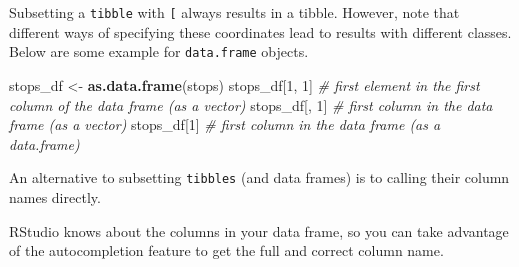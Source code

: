\documentclass[
]{book}
\newenvironment{Shaded}{\begin{snugshade}}{\end{snugshade}}
\newcommand{\CommentTok}[1]{\textcolor[rgb]{0.56,0.35,0.01}{\textit{#1}}}
\newcommand{\DecValTok}[1]{\textcolor[rgb]{0.00,0.00,0.81}{#1}}
\newcommand{\FunctionTok}[1]{\textcolor[rgb]{0.13,0.29,0.53}{\textbf{#1}}}
\newcommand{\NormalTok}[1]{#1}
\newcommand{\OtherTok}[1]{\textcolor[rgb]{0.56,0.35,0.01}{#1}}
\newcommand{\SpecialCharTok}[1]{\textcolor[rgb]{0.81,0.36,0.00}{\textbf{#1}}}
\newcommand{\StringTok}[1]{\textcolor[rgb]{0.31,0.60,0.02}{#1}}
\begin{document}
Subsetting a \texttt{tibble} with \texttt{{[}} always results in a tibble. However, note that different ways of specifying these coordinates lead to results with different classes. Below are some example for \texttt{data.frame} objects.

\begin{Shaded}
\begin{Highlighting}[]
\NormalTok{stops\_df }\OtherTok{\textless{}{-}} \FunctionTok{as.data.frame}\NormalTok{(stops)}
\NormalTok{stops\_df[}\DecValTok{1}\NormalTok{, }\DecValTok{1}\NormalTok{]   }\CommentTok{\# first element in the first column of the data frame (as a vector)}
\NormalTok{stops\_df[, }\DecValTok{1}\NormalTok{]    }\CommentTok{\# first column in the data frame (as a vector)}
\NormalTok{stops\_df[}\DecValTok{1}\NormalTok{]      }\CommentTok{\# first column in the data frame (as a data.frame)}
\end{Highlighting}
\end{Shaded}

An alternative to subsetting \texttt{tibbles} (and data frames) is to calling their column names directly.

\begin{Shaded}
\end{Shaded}

RStudio knows about the columns in your data frame, so you can take advantage of the autocompletion feature to get the full and correct column name.
\end{document}
